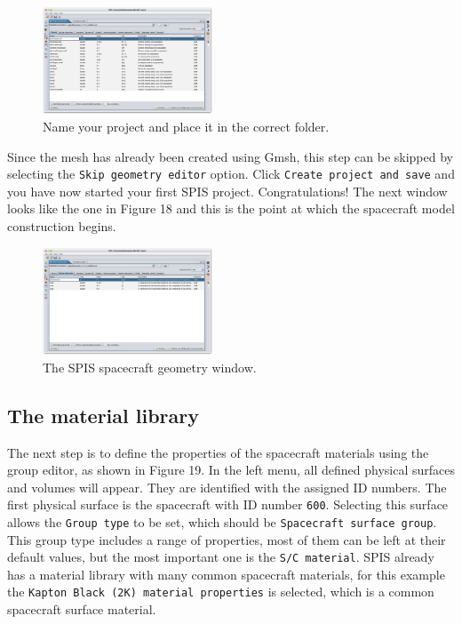 \documentclass[a4paper, 11pt]{article}
\begin{document}
\begin{figure}[!ht]
    \centering
    \includegraphics[width=0.45\textwidth]{fig17.jpg}
    \caption{Name your project and place it in the correct folder.}
\end{figure}

Since the mesh has already been created using Gmsh, this step can be skipped by selecting the \verb|Skip geometry editor| option. Click \verb|Create project and save| and you have now started your first SPIS project. Congratulations! The next window looks like the one in Figure 18 and this is the point at which the spacecraft model construction begins.

\begin{figure}[!ht]
    \centering
    \includegraphics[width=0.45\textwidth]{fig18.jpg}
    \caption{The SPIS spacecraft geometry window.}
\end{figure}

\subsection{The material library} %

The next step is to define the properties of the spacecraft materials using the group editor, as shown in Figure 19. In the left menu, all defined physical surfaces and volumes will appear. They are identified with the assigned ID numbers. The first physical surface is the spacecraft with ID number \verb|600|. Selecting this surface allows the \verb|Group type| to be set, which should be \verb|Spacecraft surface group|. This group type includes a range of properties, most of them can be left at their default values, but the most important one is the \verb|S/C material|. SPIS already has a material library with many common spacecraft materials, for this example the \verb|Kapton Black (2K) material properties| is selected, which is a common spacecraft surface material.
\end{document}
